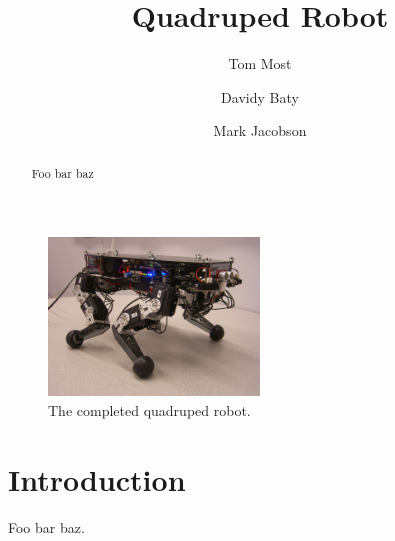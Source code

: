 \documentclass[11pt,letterpaper,twocolumn]{article}
\begin{document}
\title{Quadruped Robot} %
\author{Tom Most \and Davidy Baty \and Mark Jacobson}

\maketitle

\begin{figure}[b]
	\centering
		\includegraphics[width=0.5\textwidth]{cimg7445-robot.jpg}
	\caption{The completed quadruped robot.}
\end{figure}


\begin{abstract}
Foo bar baz
\end{abstract}

\section{Introduction}


Foo bar baz.

%
%
\end{document}
